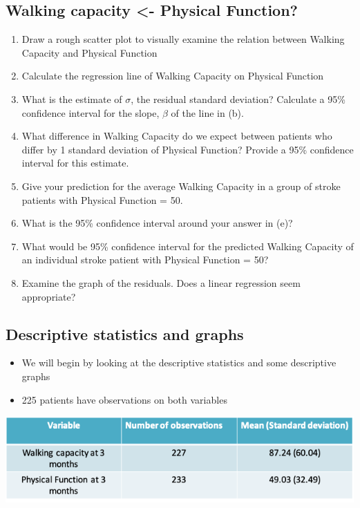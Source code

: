 \documentclass[
]{book}
\providecommand{\tightlist}{%
  \setlength{\itemsep}{0pt}\setlength{\parskip}{0pt}}
\begin{document}
\hypertarget{walking-capacity---physical-function}{%
\subsection{Walking capacity \textless- Physical Function?}\label{walking-capacity---physical-function}}

\begin{enumerate}
\def\labelenumi{\alph{enumi})}
\item
  Draw a rough scatter plot to visually examine the relation between Walking Capacity and Physical Function
\item
  Calculate the regression line of Walking Capacity on Physical Function
\item
  What is the estimate of \(\sigma\), the residual standard deviation? Calculate a 95\% confidence interval for the slope, \(\beta\) of the line in (b).
\item
  What difference in Walking Capacity do we expect between patients who differ by 1 standard deviation of Physical Function? Provide a 95\% confidence interval for this estimate.
\item
  Give your prediction for the average Walking Capacity in a group of stroke patients with Physical Function = 50.
\item
  What is the 95\% confidence interval around your answer in (e)?
\item
  What would be 95\% confidence interval for the predicted Walking Capacity of an individual stroke patient with Physical Function = 50?
\item
  Examine the graph of the residuals. Does a linear regression seem appropriate?
\end{enumerate}

\hypertarget{descriptive-statistics-and-graphs}{%
\subsection{Descriptive statistics and graphs}\label{descriptive-statistics-and-graphs}}

\begin{itemize}
\tightlist
\item
  We will begin by looking at the descriptive statistics and some descriptive graphs
\item
  225 patients have observations on both variables
\end{itemize}

\includegraphics[width=1\linewidth]{./12_12}
\end{document}
